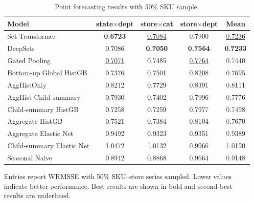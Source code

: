 \documentclass[12pt]{article}
\begin{document}
\begin{table}[H]
  \centering
  \caption{Point forecasting results with 50\% SKU sample.}
  \label{tab:appendix_point_50pct}
  \begin{threeparttable}
    \begin{tabular}{lcccc}
      \toprule
      Model                     & state$\times$dept  & store$\times$cat   & store$\times$dept  & Mean               \\
      \midrule
      Set Transformer                & \textbf{0.6723}    & \underline{0.7084} & 0.7900             & \underline{0.7236} \\
      DeepSets                       & 0.7086             & \textbf{0.7050}    & \textbf{0.7564}    & \textbf{0.7233}    \\
      Gated Pooling                  & \underline{0.7071} & 0.7485             & \underline{0.7764} & 0.7440             \\
      Bottom-up Global HistGB        & 0.7376             & 0.7501             & 0.8208             & 0.7695             \\
      AggHistOnly                    & 0.8212             & 0.7729             & 0.8391             & 0.8111             \\
      AggHist Child-summary          & 0.7930             & 0.7402             & 0.7996             & 0.7776             \\
      Child-summary HistGB           & 0.7258             & 0.7259             & 0.7977             & 0.7498             \\
      Aggregate HistGB               & 0.7521             & 0.7384             & 0.8104             & 0.7670             \\
      Aggregate Elastic Net          & 0.9492             & 0.9323             & 0.9351             & 0.9389             \\
      Child-summary Elastic Net      & 1.0472             & 1.0132             & 0.9966             & 1.0190             \\
      Seasonal Naive                 & 0.8912             & 0.8868             & 0.9664             & 0.9148             \\
      \bottomrule
    \end{tabular}
    \begin{tablenotes}
      \footnotesize \item Entries report WRMSSE with 50\% SKU--store series sampled. Lower values indicate better performance. Best results are shown in bold and second-best results are underlined.
    \end{tablenotes}
  \end{threeparttable}
\end{table}
\end{document}
